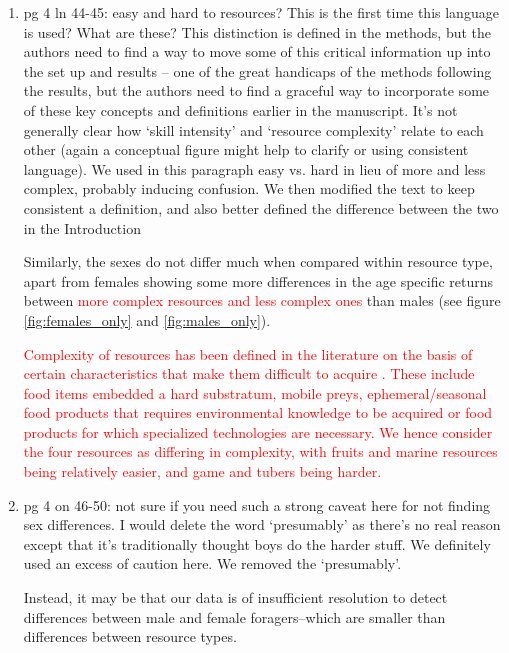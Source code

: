 \documentclass{article}
\newcommand{\rev}[1]{{\color{ForestGreen}#1}}
\begin{document}
\begin{enumerate}
    \item pg 4 ln 44-45: easy and hard to resources? This is the first time this language is used? What are these? This distinction is defined in the methods, but the authors need to find a way to move some of this critical information up into the set up and results – one of the great handicaps of the methods following the results, but the authors need to find a graceful way to incorporate some of these key concepts and definitions earlier in the manuscript. It’s not generally clear how ‘skill intensity’ and ‘resource complexity’ relate to each other (again a conceptual figure might help to clarify or using consistent language).
    \rev{We used in this paragraph easy vs. hard in lieu of more and less complex, probably inducing confusion. We then modified the text to keep consistent a definition, and also better defined the difference between the two in the Introduction  }
    \begin{displayquote}
    Similarly, the sexes do not differ much when compared within resource type, apart from females showing some more differences in the age specific returns between \textcolor{red}{more complex resources and less complex ones} than males (see figure \ref{fig:females_only} and \ref{fig:males_only}). 
    \end{displayquote}
    \begin{displayquote}
    \textcolor{red}{Complexity of resources has been defined in the literature on the basis of certain characteristics that make them difficult to acquire \citep{schuppli_life_2016, veile_hunter-gatherer_2018}. These include food items embedded a hard substratum, mobile preys, ephemeral/seasonal food products that requires environmental knowledge to be acquired or food products for which specialized technologies are necessary. We hence consider the four resources as differing in complexity, with fruits and marine resources being relatively easier, and game and tubers being harder. }
    \end{displayquote}
    
    \item pg 4 on 46-50: not sure if you need such a strong caveat here for not finding sex differences. I would delete the word ‘presumably’ as there’s no real reason except that it’s traditionally thought boys do the harder stuff.
    \rev{We definitely used an excess of caution here. We removed the `presumably'. }
    \begin{displayquote}
    Instead, it may be that our data is of insufficient resolution to detect differences between male and female foragers--which are  smaller than differences between resource types. 
    \end{displayquote}
     

\end{enumerate}
\end{document}
